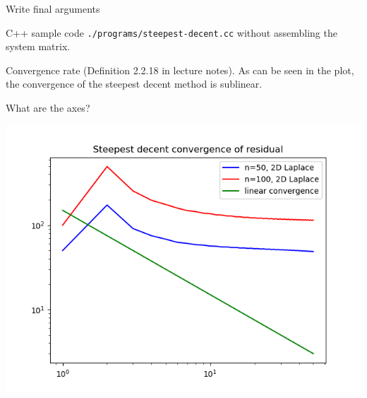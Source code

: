 \begin{SolutionSheet}[\ref{sheet8}]
\begin{Solution}
    \begin{todo}
      Write final arguments
    \end{todo}
  \end{Solution}

  \begin{Solution}
  \end{Solution}

  \begin{Solution}[Programming]
    C++ sample code \lstinline{./programs/steepest-decent.cc} without
    assembling the system matrix.

    Convergence rate (Definition 2.2.18 in lecture notes).  As can be
    seen in the plot, the convergence of the steepest decent method is
    sublinear.

    \begin{todo}
      What are the axes?
    \end{todo}
    \includegraphics[width=\textwidth]{figures/laplace-steepest-decent}
  \end{Solution}

\end{SolutionSheet}


